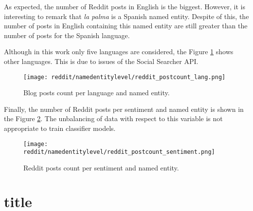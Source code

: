 \par As expected, the number of Reddit posts in English is the biggest. However, it is interesting to remark that \textit{la palma} is a Spanish named entity. Despite of this, the number of posts in English containing this named entity are still greater than the number of posts for the Spanish language. 
\par Although in this work only five languages are considered, the Figure \ref{fig:reddit_postcount_lang_entity} shows other languages. This is due to issues of the Social Searcher API.
\begin{figure}[H]
	\begin{center}
		\texttt{[image: reddit/namedentitylevel/reddit\_postcount\_lang.png]}
		\caption{Blog posts count per language and named entity.}
		\label{fig:reddit_postcount_lang_entity}
	\end{center}
\end{figure}


\par Finally, the number of Reddit posts per sentiment and named entity is shown in the Figure \ref{fig:reddit_postcount_sentiment_entity}. The unbalancing of data with respect to this variable is not appropriate to train classifier models.
\begin{figure}[H]
	\begin{center}
		\texttt{[image: reddit/namedentitylevel/reddit\_postcount\_sentiment.png]}
		\caption{Reddit posts count per sentiment and named entity.}
		\label{fig:reddit_postcount_sentiment_entity}
	\end{center}
\end{figure}


\section{title}
	
		

